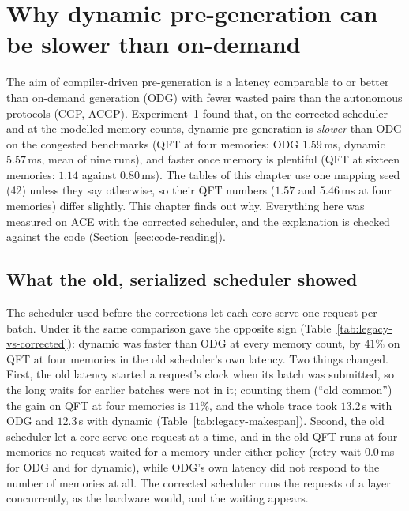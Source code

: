 \chapter{Why dynamic pre-generation can be slower than on-demand}
\label{ch:why-dynamic}

The aim of compiler-driven pre-generation is a latency comparable to or better than on-demand generation (ODG) with fewer wasted pairs than the autonomous
protocols (CGP, ACGP). Experiment~1 found that, on the corrected scheduler and at the modelled memory counts, dynamic pre-generation is \emph{slower} than ODG on the congested benchmarks
(QFT at four memories: ODG $1.59$\,ms, dynamic $5.57$\,ms, mean of nine runs), and faster once memory is plentiful (QFT at sixteen memories: $1.14$ against $0.80$\,ms). The tables of this chapter use one mapping seed (42) unless they say otherwise, so their QFT numbers ($1.57$ and $5.46$\,ms at four memories) differ slightly. This chapter finds out why.
Everything here was measured on ACE with the corrected scheduler, and the explanation is checked against the code (Section~\ref{sec:code-reading}).

\section{What the old, serialized scheduler showed}
The scheduler used before the corrections let each core serve one request per batch. Under it the same comparison gave the opposite sign
(Table~\ref{tab:legacy-vs-corrected}): dynamic was faster than ODG at every memory count, by $41\%$ on QFT at four memories in the old scheduler's own latency.
Two things changed. First, the old latency started a request's clock when its batch was submitted, so the long waits for earlier batches were not in it; counting them
(``old common'') the gain on QFT at four memories is $11\%$, and the whole trace took $13.2$\,s with ODG and $12.3$\,s with dynamic (Table~\ref{tab:legacy-makespan}).
Second, the old scheduler let a core serve one request at a time, and in the old QFT runs at four memories no request waited for a memory under either policy
(retry wait $0.0$\,ms for ODG and for dynamic), while ODG's own latency did not respond to the number of memories at all. The corrected scheduler runs the requests of a layer
concurrently, as the hardware would, and the waiting appears.





